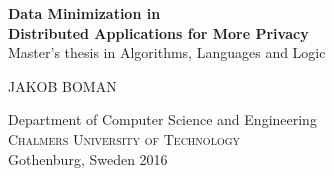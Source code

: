 \begin{titlepage}
			
\addtolength{\voffset}{2cm}


\mbox{}
\vfill
\renewcommand{\familydefault}{\sfdefault} \normalfont %
\textbf{{\Huge 	Data Minimization in 	\\[0.2cm] 
				Distributed Applications for More Privacy}} 	\\[0.5cm]
Master's thesis in Algorithms, Languages and Logic \setlength{\parskip}{1cm}

{\Large JAKOB BOMAN} \setlength{\parskip}{2.9cm}

Department of Computer Science and Engineering \\
\textsc{Chalmers University of Technology} \\
Gothenburg, Sweden 2016

\renewcommand{\familydefault}{\rmdefault} \normalfont %
\end{titlepage}


\newpage
\restoregeometry
\thispagestyle{empty}
\mbox{}


